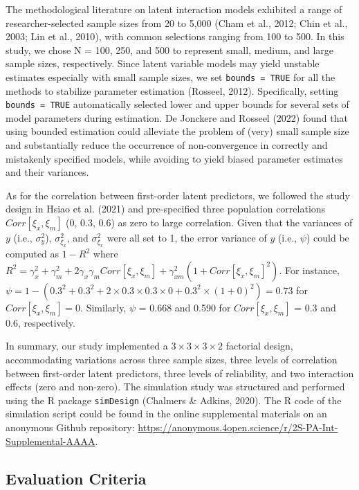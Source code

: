 \documentclass[
  man,mask]{apa6}
\begin{document}
The methodological literature on latent interaction models exhibited a range of researcher-selected sample sizes from 20 to 5,000 (Cham et al., 2012; Chin et al., 2003; Lin et al., 2010), with common selections ranging from 100 to 500. In this study, we chose N = 100, 250, and 500 to represent small, medium, and large sample sizes, respectively. Since latent variable models may yield unstable estimates especially with small sample sizes, we set \texttt{bounds\ =\ TRUE} for all the methods to stabilize parameter estimation (Rosseel, 2012). Specifically, setting \texttt{bounds\ =\ TRUE} automatically selected lower and upper bounds for several sets of model parameters during estimation. De Jonckere and Rosseel (2022) found that using bounded estimation could alleviate the problem of (very) small sample size and substantially reduce the occurrence of non-convergence in correctly and mistakenly specified models, while avoiding to yield biased parameter estimates and their variances.

As for the correlation between first-order latent predictors, we followed the study design in Hsiao et al. (2021) and pre-specified three population correlations \(Corr[{\xi_{x},\xi_{m}}]\) (0, 0.3, 0.6) as zero to large correlation. Given that the variances of \(y\) (i.e., \(\sigma_{y}^2\)), \(\sigma_{\xi_{x}}^2\), and \(\sigma_{\xi_{x}}^2\) were all set to 1, the error variance of \(y\) (i.e., \(\psi\)) could be computed as \(1 - R^2\) where \(R^2 = \gamma_{x}^2 + \gamma_{m}^2 + 2\gamma_{x}\gamma_{m}Corr[{\xi_{x},\xi_{m}}] + \gamma_{xm}^2(1 + Corr[{\xi_{x},\xi_{m}}]^2)\). For instance, \(\psi = 1 - (0.3^2 + 0.3^2 + 2\times0.3\times0.3\times0 + 0.3^2\times(1 + 0)^2) = 0.73\) for \(Corr[{\xi_{x},\xi_{m}}] = 0\). Similarly, \(\psi\) = 0.668 and 0.590 for \(Corr[{\xi_{x},\xi_{m}}]\) = 0.3 and 0.6, respectively.

In summary, our study implemented a \(3 \times 3 \times 3 \times 2\) factorial design, accommodating variations across three sample sizes, three levels of correlation between first-order latent predictors, three levels of reliability, and two interaction effects (zero and non-zero). The simulation study was structured and performed using the R package \texttt{simDesign} (Chalmers \& Adkins, 2020). The R code of the simulation script could be found in the online supplemental materials on an anonymous Github repository: \url{https://anonymous.4open.science/r/2S-PA-Int-Supplemental-AAAA}.

\subsection{Evaluation Criteria}\label{evaluation-criteria}
\end{document}
